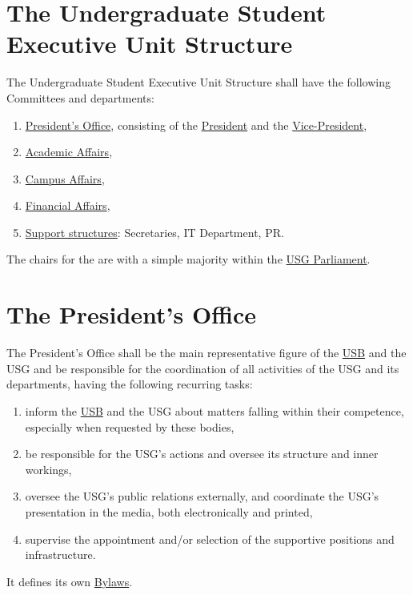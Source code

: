 \label{USGexecutiveUnitDef}

\section{The Undergraduate Student Executive Unit Structure} 
\label{USGstructure}
The Undergraduate Student Executive Unit Structure shall have the following Committees and departments:
\begin{enumerate}
\item \hyperref[PresidentOfficeDef]{President's Office}, consisting of the \hyperref[PresDef]{President} and the \hyperref[VPDef]{Vice-President},
\item \hyperref[AACdef]{Academic Affairs},
\item \hyperref[CACdef]{Campus Affairs},
\item \hyperref[Financesdef]{Financial Affairs},
\item \hyperref[suppstrucdef]{Support structures}: Secretaries, IT Department, PR.
\end{enumerate}
The chairs for the  are  with a simple majority within the \hyperref[USGParliamentDef]{USG Parliament}.


\section{The President's Office} 
\label{PresidentOfficeDef}
The President's Office shall be the main representative figure of the \hyperref[studentbody]{USB} and the USG and be responsible for the coordination of all activities of the USG and its departments, having the following recurring tasks:
\begin{enumerate}
\item {} inform the \hyperref[studentbody]{USB} and the USG about matters falling within their competence, especially when requested by these bodies,
\item be responsible for the USG's actions and oversee its structure and inner workings,
\item oversee the USG's public relations externally, and coordinate the USG's presentation in the media, both electronically and printed,
\item supervise the appointment and/or selection of the supportive positions and infrastructure.
\end{enumerate}
It defines its own \hyperref[PresByLawsDef]{Bylaws}.


